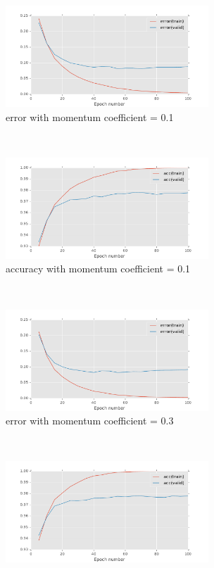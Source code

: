 \documentclass[11pt]{article}
\begin{document}
\begin{figure}[t!]
    \centering
    \begin{subfigure}[t]{0.45\textwidth}
        \centering
        \includegraphics[height=1.5in]{error_with_mom_0_1.pdf}
        \caption{error with momentum coefficient = 0.1}
    \end{subfigure}   
    ~
    \begin{subfigure}[t]{0.45\textwidth}
        \centering
        \includegraphics[height=1.5in]{acc_with_mom_0_1.pdf}
        \caption{accuracy with momentum coefficient = 0.1}
    \end{subfigure}   
    ~
    \begin{subfigure}[t]{0.45\textwidth}
        \centering
        \includegraphics[height=1.5in]{error_with_mom_0_3.pdf}
        \caption{error with momentum coefficient = 0.3}
    \end{subfigure}   
    ~
    \begin{subfigure}[t]{0.45\textwidth}
        \centering
        \includegraphics[height=1.5in]{acc_with_mom_0_3.pdf}

\end{subfigure}
\end{figure}
\end{document}

